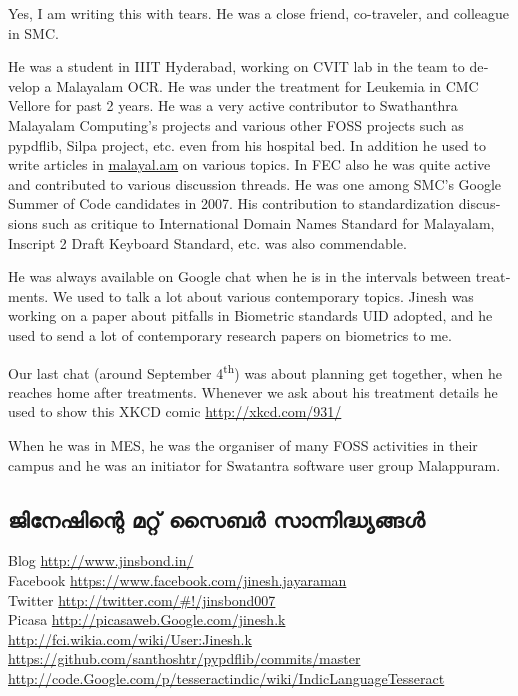 \begin{english}
\enlargethispage*{3\baselineskip}
Yes, I am writing this with tears. He was a close friend,
co-traveler, and colleague in SMC.

He was a student in IIIT Hyderabad, working on CVIT lab in the team
to develop a Malayalam OCR. He was under the treatment for Leukemia in
CMC Vellore for past 2 years. He was a very active contributor to
Swathanthra Malayalam Computing's projects and various other FOSS
projects such as pypdflib, Silpa project, etc. even from his hospital
bed. In addition he used to write articles in \url{malayal.am} on various
topics. In FEC also he was quite active and contributed to various
discussion threads. He was one among SMC's  Google Summer of Code
candidates in 2007. His contribution to standardization discussions
such as critique to International Domain Names Standard for Malayalam,
Inscript 2 Draft Keyboard Standard, etc. was also commendable.

He was always available on Google chat when he is in the intervals
between treatments. We used to talk a lot about various contemporary
topics. Jinesh was working on a paper about pitfalls in Biometric
standards UID adopted, and he used to send a lot of contemporary
research papers on biometrics to me.

Our last chat (around September 4\textsuperscript{th}) was about planning get together, when
he reaches home after treatments.
Whenever we ask about his treatment details he used to show this XKCD comic
\url{http://xkcd.com/931/}

When he was in MES, he was the organiser of many FOSS activities in
their campus and he was an initiator for Swatantra software user group
Malappuram.
\end{english}

\subsection*{ജിനേഷിന്റെ മറ്റ് സൈബര്‍ സാന്നിദ്ധ്യങ്ങള്‍}
Blog \url{http://www.jinsbond.in/} \\
Facebook \url{https://www.facebook.com/jinesh.jayaraman} \\
Twitter \url{http://twitter.com/#!/jinsbond007} \\
Picasa \url{http://picasaweb.Google.com/jinesh.k} \\
\url{http://fci.wikia.com/wiki/User:Jinesh.k} \\
\url{https://github.com/santhoshtr/pypdflib/commits/master} \\
\url{http://code.Google.com/p/tesseractindic/wiki/IndicLanguageTesseract}
\newpage
